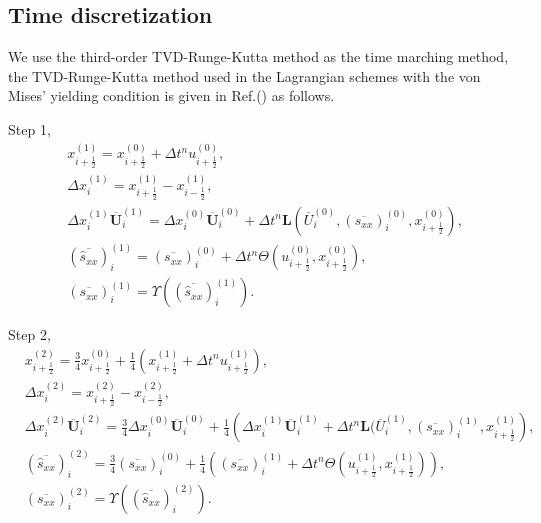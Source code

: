 \documentclass[review]{elsarticle}
\begin{document}
\subsection{Time discretization}
We use the third-order TVD-Runge-Kutta method  as the time marching method, the TVD-Runge-Kutta method used in the Lagrangian schemes with  the von Mises' yielding condition is given in Ref.(\cite{cheng2016harten}) as follows.

Step 1,
\begin{equation}
  \begin{aligned}
    & x_{i+\frac{1}{2}}^{(1)} = x_{i+\frac{1}{2}}^{(0)}+\Delta t^n u_{i+\frac{1}{2}}^{(0)},\\
    & \Delta x_i^{(1)} =  x_{i+\frac{1}{2}}^{(1)}- x_{i-\frac{1}{2}}^{(1)},\\
    & \Delta x_i^{(1)} \overline{\mathbf{U}}_i^{(1)}= \Delta x_i^{(0)} \overline{\mathbf{U}}_i^{(0)}+\Delta t^n \mathbf{L}(\overline{U}_i^{(0)}, (\overline{s_{xx}})_i^{(0)}, x_{i+\frac{1}{2}}^{(0)}),\\
    & (\overline{\hat{s}_{xx}})_i^{(1)} = (\overline{s_{xx}})_i^{(0)} +\Delta t^ n  \varTheta (u_{i+\frac{1}{2}}^{(0)}, x_{i+\frac{1}{2}}^{(0)}),\\
  & (\overline{s_{xx}})_i^{(1)} = \Upsilon((\overline{\hat{s}_{xx}})_i^{(1)}).
\end{aligned}
\end{equation}


Step 2,
\begin{equation}
  \begin{aligned}
    & x_{i+\frac{1}{2}}^{(2)} = \frac{3}{4} x_{i+\frac{1}{2}}^{(0)}+\frac{1}{4} \left( x_{i+\frac{1}{2}}^{(1)}+\Delta t^n u_{i+\frac{1}{2}}^{(1)}\right),\\
    & \Delta x_i^{(2)} =  x_{i+\frac{1}{2}}^{(2)}- x_{i-\frac{1}{2}}^{(2)},\\
    & \Delta x_i^{(2)} \overline{\mathbf{U}}_i^{(2)}  = \frac{3}{4} \Delta x_i^{(0)} \overline{\mathbf{U}}_i^{(0)}+ \frac{1}{4} \left(  \Delta x_i^{(1)} \overline{\mathbf{U}}_i^{(1)} + \Delta t^n \mathbf{L}(\overline{U}_i^{(1)}, (\overline{s_{xx}})_i^{(1)}, x_{i+\frac{1}{2}}^{(1)}\right),\\
    & (\overline{\hat{s}_{xx}})_i^{(2)} =\frac{3}{4} (\overline{s_{xx}})_i^{(0)} + \frac{1}{4} \left(  (\overline{s_{xx}})_i^{(1)}+\Delta t^ n \varTheta (u_{i+\frac{1}{2}}^{(1)}, x_{i+\frac{1}{2}}^{(1)})\right),\\
  & (\overline{s_{xx}})_i^{(2)} = \Upsilon((\overline{\hat{s}_{xx}})_i^{(2)}).
\end{aligned}
\end{equation}
\end{document}
